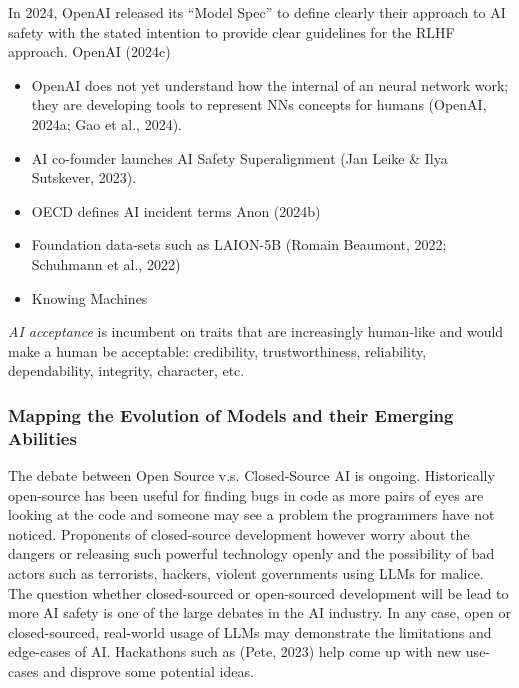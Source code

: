 \documentclass[
  letterpaper,
  DIV=11,
  numbers=noendperiod]{scrartcl}
\begin{document}
In 2024, OpenAI released its ``Model Spec'' to define clearly their
approach to AI safety with the stated intention to provide clear
guidelines for the RLHF approach. OpenAI (2024c)

\begin{itemize}
\item
  OpenAI does not yet understand how the internal of an neural network
  work; they are developing tools to represent NNs concepts for humans
  (OpenAI, 2024a; Gao et al., 2024).
\item
  AI co-founder launches AI Safety Superalignment (Jan Leike \& Ilya
  Sutskever, 2023).
\item
  OECD defines AI incident terms Anon (2024b)
\item
  Foundation data-sets such as LAION-5B (Romain Beaumont, 2022;
  Schuhmann et al., 2022)
\item
  Knowing Machines
\end{itemize}

\emph{AI acceptance} is incumbent on traits that are increasingly
human-like and would make a human be acceptable: credibility,
trustworthiness, reliability, dependability, integrity, character, etc.

\subsubsection{Mapping the Evolution of Models and their Emerging
Abilities}\label{mapping-the-evolution-of-models-and-their-emerging-abilities}

The debate between Open Source v.s. Closed-Source AI is ongoing.
Historically open-source has been useful for finding bugs in code as
more pairs of eyes are looking at the code and someone may see a problem
the programmers have not noticed. Proponents of closed-source
development however worry about the dangers or releasing such powerful
technology openly and the possibility of bad actors such as terrorists,
hackers, violent governments using LLMs for malice. The question whether
closed-sourced or open-sourced development will be lead to more AI
safety is one of the large debates in the AI industry. In any case, open
or closed-sourced, real-world usage of LLMs may demonstrate the
limitations and edge-cases of AI. Hackathons such as (Pete, 2023) help
come up with new use-cases and disprove some potential ideas.
\end{document}
